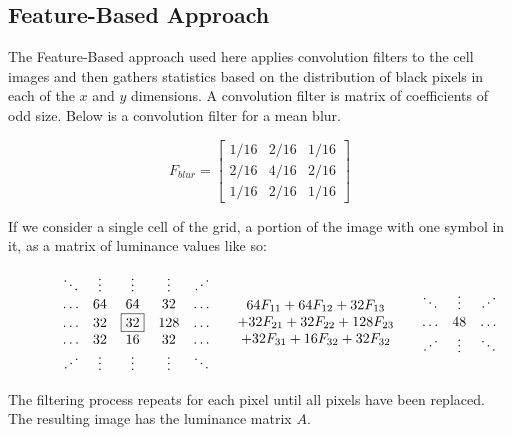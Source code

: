 \documentclass[preprint,3p,12pt]{elsarticle}
\begin{document}
\subsection{Feature-Based Approach}
\label{process:featurebased}

The Feature-Based approach used here applies convolution filters to the cell images and then
gathers statistics based on the distribution of black pixels in each of the $x$ and $y$ dimensions.
A convolution filter is matrix of coefficients of odd size. Below is a convolution filter for a
mean blur.

\[
F_{blur} = \left[
\begin{array}{ccc}
1/16 & 2/16 & 1/16 \\
2/16 & 4/16 & 2/16 \\
1/16 & 2/16 & 1/16
\end{array}\right]
\]


If we consider a single cell of the grid, a portion of the image with one symbol in it, as a matrix
of luminance values like so:

\begin{figure}
\[
\begin{array}{lcr}
\begin{array}{ccccc}
\ddots & \vdots & \vdots & \vdots & \iddots \\
\ldots & 64 & 64 & 32 & \ldots \\
\ldots & 32 & \fbox{32} & 128 & \ldots \\
\ldots & 32 & 16 & 32 & \ldots \\
\iddots & \vdots & \vdots & \vdots & \ddots \\
\end{array} &
\begin{array}{c}
64F_{11} + 64F_{12} + 32F_{13} \\
+ 32F_{21} + 32F_{22} + 128F_{23} \\
+ 32F_{31} + 16F_{32} + 32F_{32} \\
\end{array} &
\begin{array}{ccccc}
\ddots & \vdots & \iddots \\
\ldots &  48  & \ldots \\
\iddots & \vdots & \ddots \\
\end{array}
\end{array}
\]
\end{figure}

The filtering process repeats for each pixel until all pixels have been replaced.
The resulting image has the luminance matrix $A$.
\end{document}
